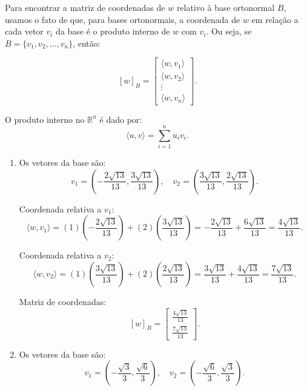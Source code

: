 \begin{resolution}
  Para encontrar a matriz de coordenadas de \( w \) relativo à base ortonormal \( B \), usamos o fato de que, para bases ortonormais, a coordenada de \( w \) em relação a cada vetor \( v_i \) da base é o produto interno de \( w \) com \( v_i \). Ou seja, se \( B = \{v_1, v_2, \dots, v_n\} \), então:

  \[
    [w]_B = \begin{bmatrix}
      \langle w, v_1 \rangle \\
      \langle w, v_2 \rangle \\
      \vdots                 \\
      \langle w, v_n \rangle
    \end{bmatrix}.
  \]

  O produto interno no \( \mathbb{R}^n \) é dado por:
  \[
    \langle u, v \rangle = \sum_{i=1}^n u_i v_i.
  \]

  \begin{enumerate}[label=\alph*)]
    \item Os vetores da base são:
          \[
            v_1 = \left(-\frac{2\sqrt{13}}{13}, \frac{3\sqrt{13}}{13}\right), \quad v_2 = \left(\frac{3\sqrt{13}}{13}, \frac{2\sqrt{13}}{13}\right).
          \]

          Coordenada relativa a \( v_1 \):
          \[
            \langle w, v_1 \rangle = \left(1\right)\left(-\frac{2\sqrt{13}}{13}\right) + \left(2\right)\left(\frac{3\sqrt{13}}{13}\right) = -\frac{2\sqrt{13}}{13} + \frac{6\sqrt{13}}{13} = \frac{4\sqrt{13}}{13}.
          \]

          Coordenada relativa a \( v_2 \):
          \[
            \langle w, v_2 \rangle = \left(1\right)\left(\frac{3\sqrt{13}}{13}\right) + \left(2\right)\left(\frac{2\sqrt{13}}{13}\right) = \frac{3\sqrt{13}}{13} + \frac{4\sqrt{13}}{13} = \frac{7\sqrt{13}}{13}.
          \]

          Matriz de coordenadas:
          \[
            [w]_B = \begin{bmatrix}
              \frac{4\sqrt{13}}{13} \\[8pt]
              \frac{7\sqrt{13}}{13}
            \end{bmatrix}.
          \]

    \item Os vetores da base são:
          \[
            v_1 = \left(-\frac{\sqrt{3}}{3}, \frac{\sqrt{6}}{3}\right), \quad v_2 = \left(-\frac{\sqrt{6}}{3}, \frac{\sqrt{3}}{3}\right).
          \]


\end{enumerate}
\end{resolution}
